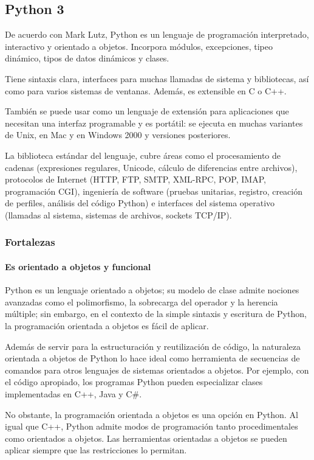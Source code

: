 \subsection{Python 3 }
De acuerdo con Mark Lutz\cite{lutz_learning_2013}, Python es un lenguaje de programación interpretado, interactivo y orientado a objetos. Incorpora módulos, excepciones, tipeo dinámico, tipos de datos dinámicos y clases.


Tiene sintaxis clara, interfaces para muchas llamadas de sistema y bibliotecas, así como para varios sistemas de ventanas. Además, es extensible en C o C++. 


También se puede usar como un lenguaje de extensión para aplicaciones que necesitan una interfaz programable y es portátil: se ejecuta en muchas variantes de Unix, en Mac y en Windows 2000 y versiones posteriores.


La biblioteca estándar del lenguaje, cubre áreas como el procesamiento de cadenas (expresiones regulares, Unicode, cálculo de diferencias entre archivos), protocolos de Internet (HTTP, FTP, SMTP, XML-RPC, POP, IMAP, programación CGI), ingeniería de software (pruebas unitarias, registro, creación de perfiles, análisis del código Python) e interfaces del sistema operativo (llamadas al sistema, sistemas de archivos, sockets TCP/IP).

\subsubsection*{Fortalezas}

\paragraph*{Es orientado a objetos y funcional}
Python es un lenguaje orientado a objetos; su modelo de clase admite nociones avanzadas como el polimorfismo, la sobrecarga del operador y la herencia múltiple; sin embargo, en el contexto de la simple sintaxis y escritura de Python, la programación orientada a objetos es fácil de aplicar.


Además de servir para la estructuración y reutilización de código, la naturaleza orientada a objetos de Python lo hace ideal como herramienta de secuencias de comandos para otros lenguajes de sistemas orientados a objetos. Por ejemplo, con el código apropiado, los programas Python pueden especializar clases implementadas en C++, Java y C\#.


No obstante, la programación orientada a objetos es una opción en Python. Al igual que C++, Python admite modos de programación tanto procedimentales como orientados a objetos. Las herramientas orientadas a objetos se pueden aplicar siempre que las restricciones lo permitan. 


